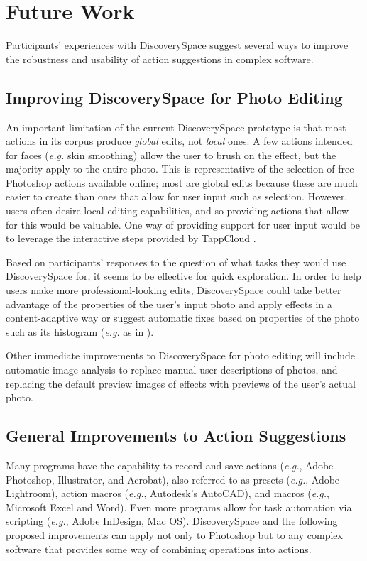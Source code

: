 \section{Future Work}
Participants' experiences with Discovery\-Space suggest several ways to improve the robustness and usability of action suggestions in complex software.

\subsection{Improving Discovery\-Space for Photo Editing}
An important limitation of the current Discovery\-Space prototype is that most actions in its corpus produce \textit{global} edits, not \textit{local} ones. A few actions intended for faces (\textit{e.g.} skin smoothing) allow the user to brush on the effect, but the majority apply to the entire photo. This is representative of the selection of free Photoshop actions available online; most are global edits because these are much easier to create than ones that allow for user input such as selection. However, users often desire local editing capabilities, and so providing actions that allow for this would be valuable. One way of providing support for user input would be to leverage the interactive steps provided by TappCloud \cite{Laput2012}.

Based on participants' responses to the question of what tasks they would use Discovery\-Space for, it seems to be effective for quick exploration. In order to help users make more professional-looking edits, Discovery\-Space could take better advantage of the properties of the user's input photo and apply effects in a content-adaptive way \cite{Berthouzoz2011} or suggest automatic fixes based on properties of the photo such as its histogram (\textit{e.g.} as in \cite{Bychkovsky2011}). 

Other immediate improvements to Discovery\-Space for photo editing will include automatic image analysis to replace manual user descriptions of photos, and replacing the default preview images of effects with previews of the user's actual photo.

\subsection{General Improvements to Action Suggestions}
Many programs have the capability to record and save actions (\textit{e.g.}, Adobe Photoshop, Illustrator, and Acrobat), also referred to as presets (\textit{e.g.}, Adobe Lightroom), action macros (\textit{e.g.}, Autodesk's AutoCAD), and macros (\textit{e.g.}, Microsoft Excel and Word). Even more programs allow for task automation via scripting (\textit{e.g.}, Adobe InDesign, Mac OS). Discovery\-Space and the following proposed improvements can apply not only to Photoshop but to any complex software that provides some way of combining operations into actions.

